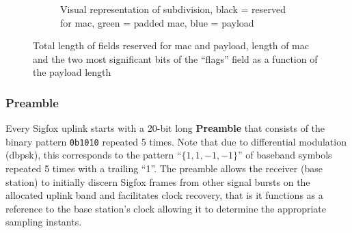 \begin{figure}[h]
\begin{subfigure}[t]{0.40\textwidth}
		\vspace{0.1cm}
		\caption{Visual representation of subdivision, black = reserved for \gls{mac}, green = padded \gls{mac}, blue = payload}
	\end{subfigure}
	\caption{Total length of fields reserved for \gls{mac} and payload, length of \gls{mac} and the two most significant bits of the ``flags'' field as a function of the payload length}
	\label{fig:uplink_length_combinations}
\end{figure}

\subsubsection{Preamble}
Every Sigfox uplink starts with a 20-bit long \textbf{Preamble} that consists of the binary pattern \texttt{0b1010} repeated 5 times.
Note that due to differential modulation (\gls{dbpsk}), this corresponds to the pattern ``$\{1, 1, -1, -1\}$'' of baseband symbols repeated 5 times with a trailing ``1''.
The preamble allows the receiver (base station) to initially discern Sigfox frames from other signal bursts on the allocated uplink band and facilitates clock recovery, that is it functions as a reference to the base station's clock allowing it to determine the appropriate sampling instants.

